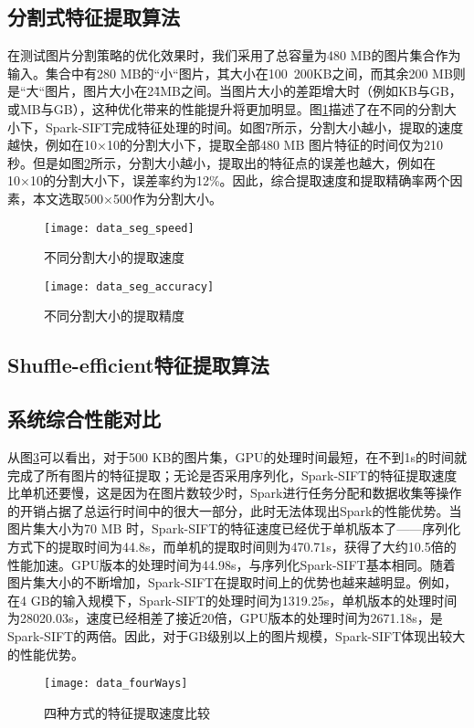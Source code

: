 \subsection{分割式特征提取算法}
在测试图片分割策略的优化效果时，我们采用了总容量为480 MB的图片集合作为输入。集合中有280 MB的``小``图片，其大小在100~200KB之间，而其余200 MB则是``大``图片，图片大小在2\~4MB之间。当图片大小的差距增大时（例如KB与GB，或MB与GB），这种优化带来的性能提升将更加明显。图\ref{fig:data_seg_speed}描述了在不同的分割大小下，Spark-SIFT完成特征处理的时间。如图7所示，分割大小越小，提取的速度越快，例如在10×10的分割大小下，提取全部480 MB 图片特征的时间仅为210 秒。但是如图\ref{fig:data_seg_accuracy}所示，分割大小越小，提取出的特征点的误差也越大，例如在10×10的分割大小下，误差率约为12\%。因此，综合提取速度和提取精确率两个因素，本文选取500×500作为分割大小。
\begin{figure}[htp]
\centering
\texttt{[image: data\_seg\_speed]}
\caption{不同分割大小的提取速度}
\label{fig:data_seg_speed}
\end{figure}

\begin{figure}[htp]
\centering
\texttt{[image: data\_seg\_accuracy]}
\caption{不同分割大小的提取精度}
\label{fig:data_seg_accuracy}
\end{figure}

\subsection{Shuffle-efficient特征提取算法}

\subsection{系统综合性能对比}
从图\ref{fig:data_fourWays}可以看出，对于500 KB的图片集，GPU的处理时间最短，在不到1s的时间就完成了所有图片的特征提取；无论是否采用序列化，Spark-SIFT的特征提取速度比单机还要慢，这是因为在图片数较少时，Spark进行任务分配和数据收集等操作的开销占据了总运行时间中的很大一部分，此时无法体现出Spark的性能优势。当图片集大小为70 MB 时，Spark-SIFT的特征速度已经优于单机版本了——序列化方式下的提取时间为44.8s，而单机的提取时间则为470.71s，获得了大约10.5倍的性能加速。GPU版本的处理时间为44.98s，与序列化Spark-SIFT基本相同。随着图片集大小的不断增加，Spark-SIFT在提取时间上的优势也越来越明显。例如，在4 GB的输入规模下，Spark-SIFT的处理时间为1319.25s，单机版本的处理时间为28020.03s，速度已经相差了接近20倍，GPU版本的处理时间为2671.18s，是Spark-SIFT的两倍。因此，对于GB级别以上的图片规模，Spark-SIFT体现出较大的性能优势。
\begin{figure}[htp]
\centering
\texttt{[image: data\_fourWays]}
\caption{四种方式的特征提取速度比较}
\label{fig:data_fourWays}
\end{figure}

